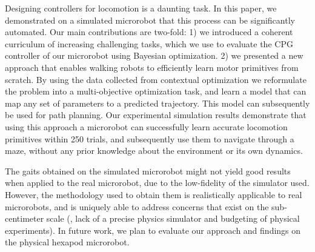 Designing controllers for locomotion is a daunting task.
In this paper, we demonstrated on a simulated microrobot that this process can be significantly automated. 
Our main contributions are two-fold: 
1) we introduced a coherent curriculum of increasing challenging tasks, which we use to evaluate the CPG controller of our microrobot using Bayesian optimization.
2) we presented a new approach that enables walking robots to efficiently learn motor primitives from scratch.
By using the data collected from contextual optimization we reformulate the problem into a multi-objective optimization task, and learn a model that can map any set of parameters to a predicted trajectory. 
This model can subsequently be used for path planning.
Our experimental simulation results demonstrate that using this approach a microrobot can successfully learn accurate locomotion primitives within 250 trials, and subsequently use them to navigate through a maze, without any prior knowledge about the environment or its own dynamics. 

The gaits obtained on the simulated microrobot might not yield good results when applied to the real microrobot, due to the low-fidelity of the simulator used. 
However, the methodology used to obtain them is realistically applicable to real microrobots, and is uniquely able to address concerns that exist on the sub-centimeter scale (\eg, lack of a precise physics simulator and budgeting of physical experiments). 
In future work, we plan to evaluate our approach and findings on the physical hexapod microrobot.